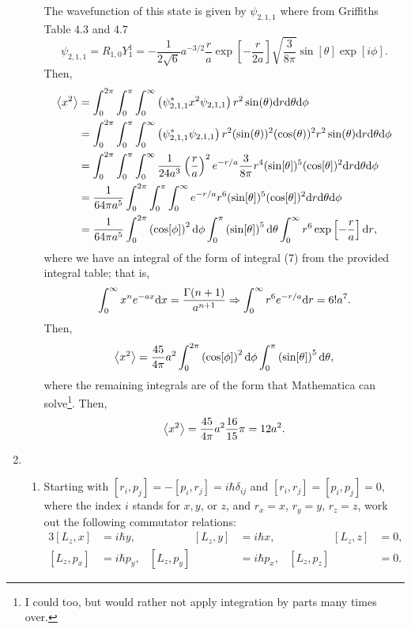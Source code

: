 \documentclass[a4paper, 12pt]{config/homework}
\begin{document}
\begin{enumerate}
\begin{enumerate}[label=(\alph*)]
The wavefunction of this state is given by \(\psi_{2,1,1}\) where from Griffiths Table 4.3 and 4.7
\[\psi_{2,1,1} = R_{1,0}Y_1^1 = -\frac{1}{2\sqrt{6}}a^{-3/2}\frac{r}{a}\exp\left[-\frac{r}{2a}\right]\sqrt{\frac{3}{8\pi}}\sin[\theta]\exp\left[i\phi\right].\]
Then,
\begin{align*}
\left\langle x^2 \right\rangle &= \int_{0}^{2\pi}{\int_{0}^{\pi}{\int_{0}^{\infty}{
    \left(\psi_{2,1,1}^* x^2 \psi_{2,1,1}\right) r^2\sin(\theta)
 \text{d}r} \text{d}\theta} \text{d}\phi}
\\&= \int_{0}^{2\pi}{\int_{0}^{\pi}{\int_{0}^{\infty}{
    \left(\psi_{2,1,1}^* \psi_{2,1,1}\right) r^2(\sin(\theta))^2(\cos(\theta))^2r^2\sin(\theta)
 \text{d}r} \text{d}\theta} \text{d}\phi}
\\&= \int_{0}^{2\pi}{\int_{0}^{\pi}{\int_{0}^{\infty}{
    \frac{1}{24a^3}\left(\frac{r}{a}\right)^2e^{-r/a}\frac{3}{8\pi} r^4(\sin[\theta])^5(\cos[\theta])^2
 \text{d}r} \text{d}\theta} \text{d}\phi}
\\&= \frac{1}{64\pi a^5} \int_{0}^{2\pi}{\int_{0}^{\pi}{\int_{0}^{\infty}{
    e^{-r/a} r^6(\sin[\theta])^5(\cos[\theta])^2
 \text{d}r} \text{d}\theta} \text{d}\phi}
\\&= \frac{1}{64\pi a^5}
\int_{0}^{2\pi}{\left(\cos[\phi]\right)^2 \text{d}\phi}
\int_{0}^{\pi}{\left(\sin[\theta]\right)^5 \text{d}\theta}
\int_{0}^{\infty}{r^6\exp\left[-\frac{r}{a}\right] \text{d}r},
\end{align*}
where we have an integral of the form of integral (7) from the provided integral table; that is,
\[\int_{0}^{\infty}{x^n e^{-ax} \text{d}x}=\frac{\Gamma(n+1)}{a^{n+1}}
\Rightarrow \int_{0}^{\infty}{r^{6} e^{-r/a} \text{d}r} = 6! a^7.\]
Then,
\[\left\langle x^2 \right\rangle = \frac{45}{4\pi}a^2 \int_{0}^{2\pi}{\left(\cos[\phi]\right)^2 \text{d}\phi}
\int_{0}^{\pi}{\left(\sin[\theta]\right)^5 \text{d}\theta},\]
where the remaining integrals are of the form that Mathematica can solve\footnote{I could too, but would rather not apply integration by parts many times over.}.
Then,
\[\left\langle x^2 \right\rangle = \frac{45}{4\pi}a^2 \frac{16}{15} \pi = 12 a^2.\]


\end{enumerate}
\pagebreak
\item \begin{enumerate}[label=(\alph*)]
\item Starting with \([r_i,p_j]=-[p_i,r_j]=i\hbar\delta_{ij}\) and \([r_i,r_j]=[p_i,p_j]=0\), where the index \(i\) stands for \(x,y\), or \(z\), and \(r_x=x\), \(r_y=y\), \(r_z=z\), work out the following commutator relations:
\begin{alignat*}{3}
[L_z,x] & =i\hbar y, & \qquad\qquad [L_z,y] & =i\hbar x, & \qquad\qquad [L_z,z] & =0, \\
[L_z,p_x]&=i\hbar p_y, & [L_z, p_y]&=i\hbar p_x, & [L_z, p_z]&=0.
\end{alignat*} \bigskip




\end{enumerate}
\end{enumerate}
\end{document}
